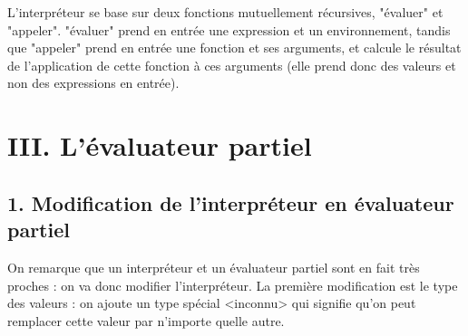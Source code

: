 \documentclass[a4paper,11pt]{article}
\newcommand{\code}[1]{{\fontfamily{pcr}\selectfont #1}}
\begin{document}
L'interpréteur se base sur deux fonctions mutuellement récursives,
"évaluer" et "appeler". "évaluer" prend en entrée une expression et un
environnement, tandis que "appeler" prend en entrée une fonction et
ses arguments, et calcule le résultat de l'application de cette
fonction à ces arguments (elle prend donc des valeurs et non des
expressions en entrée).

\begin{comment}
Le code présenté ici est légèrement simplifié,
afin de montrer clairement sa structure de base.

\begin{lstlisting}
evaluer(expression, environnement)
  Si expression est une constante:
    retourner expression
  Si expression est une variable:
    retourner trouver_variable(environnement, expression)
  Si expression est une instruction conditionnelle:
    resultat_test = evaluer(test(expression), environnement)
    Si resultat_test:
      retourner evaluer(si_vrai(expression), environnement)
    Sinon:
      retourner evaluer(si_faux(expression), environnement)
  Si expression est un appel:
    fct = evaluer(fonction(expression), environnement)
    arguments = [evaluer(arg, environnement)
        pour arg dans arguments(expression)]
    appeler(fct, arguments)

appeler(fonction, arguments)
  Si fonction est une fonction de base:
    appeler_fonction_de_base(fonction, arguments)
  Sinon:
    env = environnement_fonction(fonction)
    nouveau_env = ajout_environnement(env,
        noms_arguments(fonction), arguments)
    retourner evaluer(code(fonction), nouveau_env)
\end{lstlisting}
\end{comment}

\section{III. L'évaluateur partiel}

\subsection{1. Modification de l'interpréteur en évaluateur partiel}

On remarque que un interpréteur et un évaluateur partiel sont en fait
très proches : on va donc modifier l'interpréteur. La première
modification est le type des valeurs : on ajoute un type spécial
\code{<inconnu>} qui signifie qu'on peut remplacer cette valeur par n'importe
quelle autre.
\end{document}
